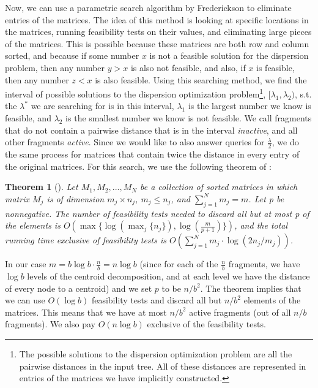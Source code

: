 \documentclass[11pt,a4paper]{article}
\newtheorem{theorem}{Theorem}[section]
\theoremstyle{definition}
\theoremstyle{remark}
\begin{document}
Now, we can use a parametric search algorithm by Frederickson to eliminate entries of the matrices. The idea of this method is looking at specific locations in the matrices, running feasibility tests on their values, and eliminating large pieces of the matrices. This is possible because these matrices are both row and column sorted, and because if some number $x$ is not a feasible solution for the dispersion problem, then any number $y>x$ is also not feasible, and also, if $x$ is feasible, then any number $z<x$ is also feasible. Using this searching method, we find the interval of possible solutions to the dispersion optimization problem\footnote{The possible solutions to the dispersion optimization problem are all the pairwise distances in the input tree. All of these distances are represented in entries of the matrices we have implicitly constructed.}, $[\lambda_1,\lambda_2)$, s.t. the $\lambda^*$ we are searching for is in this interval, $\lambda_1$ is the largest number we know is feasible, and $\lambda_2$ is the smallest number we know is not feasible. We call fragments that do not contain a pairwise distance that is in the interval \textit{inactive}, and all other fragments \textit{active}. Since we would like to also answer queries for $\frac{\lambda}{2}$, we do the same process for matrices that contain twice the distance in every entry of the original matrices.
For this search, we use the following theorem of \cite{Frederickson1991}:
\begin{theorem}[\cite{Frederickson1991}]\label{Frederickson's theorem}
Let  ${M_1, M_2, . . . , M_N}$ be a collection of sorted matrices in which matrix $M_j$ is of dimension $m_j \times n_j$, $m_j \leq n_j$, and $\sum_{j=1}^{N} m_j = m$.
Let p be nonnegative. The number of feasibility tests needed to discard all but at most p of the elements is $O(\max \lbrace \log(\max_{j} \lbrace n_j \rbrace), \log(\frac{m}{p+1}) \rbrace)$, and the total running time exclusive of feasibility tests is $O(\sum_{j=1}^{N} m_j \cdot \log (2n_j/m_j))$.
\end{theorem}
In our case $m=b \log b \cdot \frac{n}{b} = n \log b$ (since for each of the $\frac{n}{b}$ fragments, we have $\log b$ levels of the centroid decomposition, and at each level we have the distance of every node to a centroid) and we set $p$ to be $n/b^2$. The theorem implies that we can use $O(\log b)$ feasibility tests and discard all but $n/b^2$ elements of the matrices. This means that we have at most $n/b^2$ active fragments (out of all $n/b$ fragments). We also pay $O(n \log b)$ exclusive of the feasibility tests.
\end{document}
